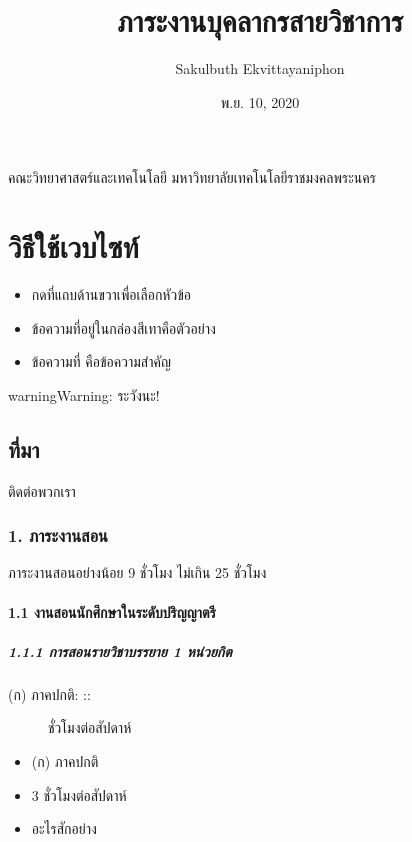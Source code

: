 \documentclass[a4paper,12pt,english]{sphinxmanual}
\title{ภาระงานบุคลากรสายวิชาการ}
\date{พ.ย. 10, 2020}
\author{Sakulbuth Ekvittayaniphon}
\begin{document}
\pagestyle{empty}
\sphinxmaketitle
\pagestyle{plain}
\sphinxtableofcontents
\pagestyle{normal}
\label{\detokenize{index::doc}}


คณะวิทยาศาสตร์และเทคโนโลยี มหาวิทยาลัยเทคโนโลยีราชมงคลพระนคร


\chapter{วิธีใช้เวบไซท์}
\label{\detokenize{index:id2}}\begin{itemize}
\item {} 
กดที่แถบด้านขวาเพื่อเลือกหัวข้อ

\item {} 
ข้อความที่อยู่ในกล่องสีเทาคือตัวอย่าง

\item {} 
ข้อความที่  คือข้อความสำคัญ

\end{itemize}

\begin{sphinxadmonition}{warning}{Warning:}
ระวังนะ!
\end{sphinxadmonition}


\section{ที่มา}
\label{\detokenize{index:id3}}
ติดต่อพวกเรา


\subsection{1. ภาระงานสอน}
\label{\detokenize{1teaching:id1}}\label{\detokenize{1teaching::doc}}
ภาระงานสอนอย่างน้อย 9 ชั่วโมง ไม่เกิน 25 ชั่วโมง


\subsubsection{1.1 งานสอนนักศึกษาในระดับปริญญาตรี}
\label{\detokenize{1teaching:id2}}

\paragraph{1.1.1 การสอนรายวิชาบรรยาย 1 หน่วยกิต}
\label{\detokenize{1teaching:id3}}\begin{description}
\item[{(ก) ภาคปกติ: ::}]  ชั่วโมงต่อสัปดาห์

\end{description}
\begin{itemize}\setlength{\itemsep}{0pt}\setlength{\parskip}{0pt}
\item {} 
(ก) ภาคปกติ

\item {} 
3 ชั่วโมงต่อสัปดาห์

\item {} 
อะไรสักอย่าง

\end{itemize}
\end{document}
